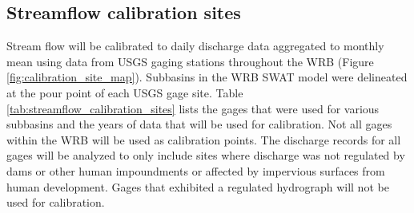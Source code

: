 \subsection{Streamflow calibration sites}\label{sec:streamflow_calibration_sites}

Stream flow will be calibrated to daily discharge data aggregated to monthly mean using data from USGS gaging stations throughout the WRB (Figure \ref{fig:calibration_site_map}). 
Subbasins in the WRB SWAT model were delineated at the pour point of each USGS gage site. 
Table \ref{tab:streamflow_calibration_sites} lists the gages that were used for various subbasins and the years of data that will be used for calibration. Not all gages within the WRB will be used as calibration points. 
The discharge records for all gages will be analyzed to only include sites where discharge was not regulated by dams or other human impoundments or affected by impervious surfaces from human development.
 Gages that exhibited a regulated hydrograph will not be used for calibration.
